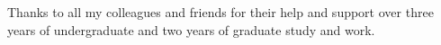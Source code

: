 \begin{acknowledgements}

Thanks to all my colleagues and friends for their help and support over three years of undergraduate and two years of graduate study and work.

\end{acknowledgements}





